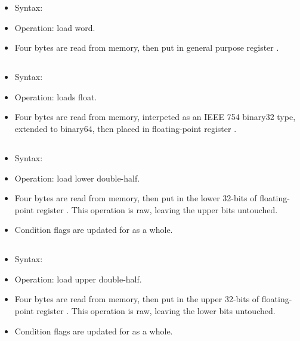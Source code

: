 \begin{itemize}
\item Syntax: 
\item Operation: load word.
\item Four bytes are read from memory, then put in general purpose register
      .
\end{itemize}

\subsection{}

\begin{itemize}
\item Syntax: 
\item Operation: loads float.
\item Four bytes are read from memory, interpeted as an IEEE 754 binary32 type,
      extended to binary64, then placed in floating-point register  .
\end{itemize}

\subsection{}

\begin{itemize}
\item Syntax: 
\item Operation: load lower double-half.
\item Four bytes are read from memory, then put in the lower 32-bits of
      floating-point register . This operation is raw, leaving the
      upper bits untouched.
\item Condition flags are updated for  as a whole.
\end{itemize}

\subsection{}

\begin{itemize}
\item Syntax: 
\item Operation: load upper double-half.
\item Four bytes are read from memory, then put in the upper 32-bits of
      floating-point register . This operation is raw, leaving the
      lower bits untouched.
\item Condition flags are updated for  as a whole.
\end{itemize}

